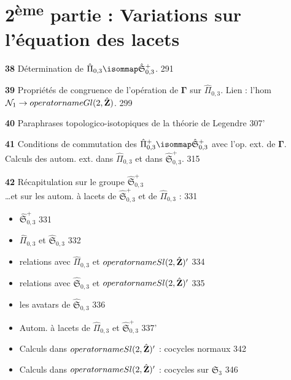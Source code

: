 \chapter*{2\textsuperscript{ème} partie : Variations sur l'équation des lacets}

\noindent \textbf{38} Détermination de $\hat{\Pi}_{0,3} \isommap \hat{\mathfrak{S}}_{0,3}^+$. \hfill 291

\vspace{0.5cm}
\noindent \textbf{39} Propriétés de congruence de l'opération de $\boldsymbol{\Gamma}$ sur $\hat{\Pi}_{0,3}$. Lien : l'hom $\mathcal{N}_1 \to \\operatorname{Gl}(2, \hat{\mathbf{Z}})$. \hfill 299

\vspace{0.5cm}
\noindent \textbf{40} Paraphrases topologico-isotopiques de la théorie de Legendre \hfill 307'

\vspace{0.5cm}
\noindent \textbf{41} Conditions de commutation des $\hat{\Pi}_{0,3}^+ \isommap \hat{\mathfrak{S}}_{0,3}^+$ avec l'op. ext. de $\boldsymbol{\Gamma}$. \\
Calculs des autom. ext. dans $\hat{\Pi}_{0,3}$ et dans $\hat{\mathfrak{S}}_{0,3}^+$. \hfill 315

\vspace{0.5cm}
\noindent \textbf{42} Récapitulation sur le groupe $\hat{\mathfrak{S}}_{0,3}^+$ \\
\dots et sur les autom. à lacets de $\hat{\mathfrak{S}}_{0,3}^+$ et de $\hat{\Pi}_{0,3}$ : \hfill 331
\begin{itemize}
    \item[I] $\hat{\mathfrak{S}}_{0,3}^+$ \hfill 331
    \item[II] $\hat{\Pi}_{0,3}$ et $\hat{\mathfrak{S}}_{0,3}$ \hfill 332
    \item[III] relations avec $\hat{\Pi}_{0,3}$ et $\\operatorname{Sl}(2, \hat{\mathbf{Z}})'$ \hfill 334
    \item[IV] relations avec $\hat{\mathfrak{S}}_{0,3}$ et $\\operatorname{Sl}(2, \hat{\mathbf{Z}})'$ \hfill 335
    \item[V] les avatars de $\hat{\mathfrak{S}}_{0,3}$ \hfill 336
    \item[VI] Autom. à lacets de $\hat{\Pi}_{0,3}$ et $\hat{\mathfrak{S}}_{0,3}^+$ \hfill 337'
    \item[VII] Calculs dans $\\operatorname{Sl}(2, \hat{\mathbf{Z}})'$ : cocycles normaux \hfill 342
    \item[VIII] Calculs dans $\\operatorname{Sl}(2, \hat{\mathbf{Z}})'$ : cocycles sur $\mathfrak{S}_3$ \hfill 346
\end{itemize}

